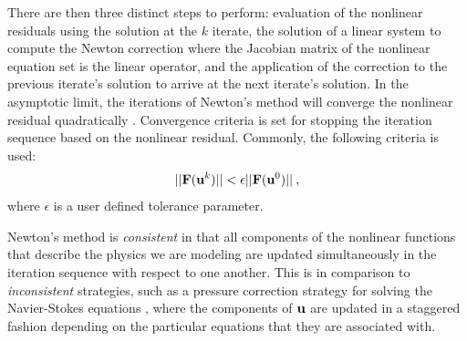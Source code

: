 There are then three distinct steps to perform: evaluation of the
nonlinear residuals using the solution at the $k$ iterate, the
solution of a linear system to compute the Newton correction where the
Jacobian matrix of the nonlinear equation set is the linear operator,
and the application of the correction to the previous iterate's
solution to arrive at the next iterate's solution. In the asymptotic
limit, the iterations of Newton's method will converge the nonlinear
residual quadratically \citep{kelley_iterative_1995}. Convergence
criteria is set for stopping the iteration sequence based on the
nonlinear residual. Commonly, the following criteria is used:
\begin{equation}
  ||\mathbf{F}(\mathbf{u}^{k})|| < \epsilon ||\mathbf{F}(\mathbf{u}^{0})||\:,
  \label{eq:newton_stopping_criteria}
\end{equation}
where $\epsilon$ is a user defined tolerance parameter. 

Newton's method is \textit{consistent} in that all components of the
nonlinear functions that describe the physics we are modeling are
updated simultaneously in the iteration sequence with respect to one
another. This is in comparison to \textit{inconsistent} strategies,
such as a pressure correction strategy for solving the Navier-Stokes
equations \citep{pletcher_computational_1997}, where the components of
$\mathbf{u}$ are updated in a staggered fashion depending on the
particular equations that they are associated with.


